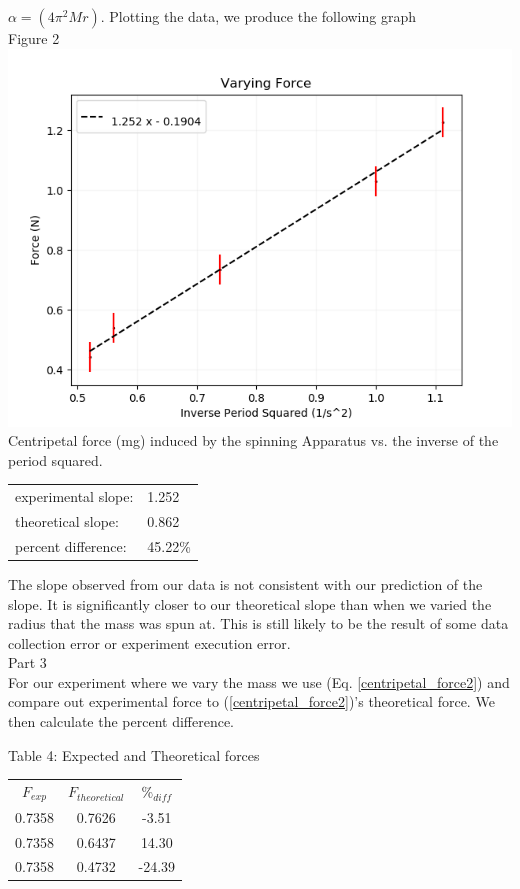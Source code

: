 \documentclass[12pt]{report}
\begin{document}
\begin{flushleft}
\begin{multicols}{2}
$\alpha = (4\pi^2Mr)$. Plotting the data, we produce the following graph \\
\small Figure 2 \\
\includegraphics[scale=0.45]{VaryingForce}
\center Centripetal force (mg) induced by the spinning Apparatus vs. the inverse
of the period squared.\\
\begin{tabular}{ll}
experimental slope: & 1.252 \\
theoretical slope: & 0.862 \\
percent difference: & 45.22\%
\end{tabular}
\flushleft The slope observed from our data is not consistent with our
prediction of the slope. It is significantly closer to our theoretical slope than
when we varied the radius that the mass was spun at. This is still likely to be the result of some data collection error or experiment execution error. \\
\vspace{10px}
\large Part 3 \\ \normalsize
For our experiment where we vary the mass we use (Eq. \ref{centripetal_force2})
and compare out experimental force to (\ref{centripetal_force2})'s theoretical force.
We then calculate the percent difference. \\
\begin{center}
\flushleft Table 4: Expected and Theoretical forces \center
\begin{tabular}{|c|c|c|}
\hline
$F_{exp}$ & $F_{theoretical}$ & $\%_{diff}$ \\
0.7358 & 0.7626 & -3.51 \\
0.7358 & 0.6437 & 14.30 \\
0.7358 & 0.4732 & -24.39 \\
\hline
\end{tabular}
\end{center}


\end{multicols}
\end{flushleft}
\end{document}
